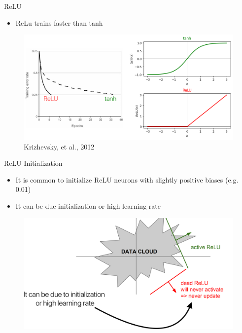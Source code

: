 \documentclass[serif, aspectratio=169]{beamer}
\begin{document}
\begin{frame}{ReLU}
	\begin{itemize}
		\item ReLu trains faster than tanh
	\end{itemize}
	\begin{figure}[htbp]
		\begin{center}
			\includegraphics[keepaspectratio, scale=0.3]{pic/relu_faster}
			\caption*{\scriptsize Krizhevsky, et al., 2012}
		\end{center}
	\end{figure}
\end{frame}

\begin{frame}{ReLU Initialization}
	\begin{itemize}
		\item It is common to initialize ReLU neurons with slightly positive biases (e.g. 0.01)
		\item It can be due initialization or high learning rate
	\end{itemize}
	\begin{figure}[htpb]
		\begin{center}
			\includegraphics[keepaspectratio, scale=0.15]{pic/dead_relu}
		\end{center}
	\end{figure}
\end{frame}
\end{document}
